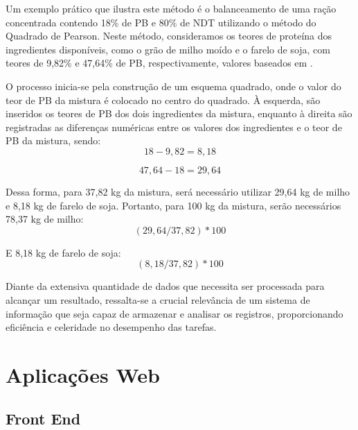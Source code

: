 Um exemplo prático que ilustra este método é o balanceamento de uma ração concentrada contendo 18\% de \gls{PB} e 80\% de \gls{NDT} utilizando o método do Quadrado de Pearson. Neste método, consideramos os teores de proteína dos ingredientes disponíveis, como o grão de milho moído e o farelo de soja, com teores de 9,82\% e 47,64\% de \gls{PB}, respectivamente, valores baseados em .

O processo inicia-se pela construção de um esquema quadrado, onde o valor do teor de \gls{PB} da mistura é colocado no centro do quadrado. À esquerda, são inseridos os teores de \gls{PB} dos dois ingredientes da mistura, enquanto à direita são registradas as diferenças numéricas entre os valores dos ingredientes e o teor de \gls{PB} da mistura, sendo: 
\begin{equation}
  \label{eq:pearson1}
  18 - 9,82 = 8,18
\end{equation}

\begin{equation}
  \label{eq:pearson2}
  47,64 - 18 = 29,64
\end{equation}

Dessa forma, para 37,82 kg da mistura, será necessário utilizar 29,64 kg de milho e 8,18 kg de farelo de soja. Portanto, para 100 kg da mistura, serão necessários 78,37 kg de milho:
\begin{equation}
 \label{eq:pearson3}
 (29,64 / 37,82)*100 
\end{equation}

E 8,18 kg de farelo de soja:
\begin{equation}
 \label{eq:pearson4}
 (8,18 / 37,82)*100
\end{equation}

Diante da extensiva quantidade de dados que necessita ser processada para alcançar um resultado, ressalta-se a crucial relevância de um sistema de informação que seja capaz de armazenar e analisar os registros, proporcionando eficiência e celeridade no desempenho das tarefas.

\section{Aplicações Web}\label{sec:aplicacoesWeb}

\subsection{Front End}\label{sec:frontEnd}



